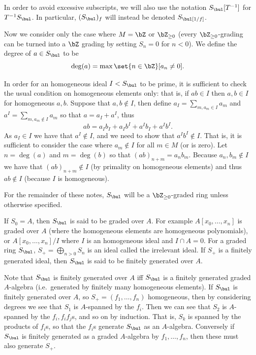 \bnote

    In order to avoid excessive subscripts, we will also use the notation $S_\bul[T^{-1}]$ for $T^{-1}S_\bul$.
    In particular, $(S_\bul)_f$ will instead be denoted $S_\bul[1/f]$.

\enote

Now we consider only the case where $M=\bZ$ or $\bZ_{\geq0}$ (every $\bZ_{\geq0}$-grading can be turned into a $\bZ$ grading
by setting $S_n=0$ for $n<0$).
We define the {\emphcolor degree} of $a\in S_\bul$ to be
$$ \deg(a) = \max\set{n\in\bZ}[a_n\neq0] . $$

In order for an homogeneous ideal $I<S_\bul$ to be prime, it is sufficient to check the usual condition on homogeneous elements
only: that is, if $ab\in I$ then $a,b\in I$ for homogeneous $a,b$.
Suppose that $a,b\notin I$, then define $a_I=\sum_{m,a_m\in I}a_m$ and $a^I=\sum_{m,a_m\notin I}a_m$ so that $a=a_I+a^I$, thus
$$ ab = a_Ib_I + a_Ib^I + a^Ib_I + a^Ib^I . $$
As $a_I\in I$ we have that $a^I\notin I$, and we need to show that $a^Ib^I\notin I$.
That is, it is sufficient to consider the case where $a_m\notin I$ for all $m\in M$ (or is zero).
Let $n=\deg(a)$ and $m=\deg(b)$ so that $(ab)_{n+m}=a_nb_m$.
Because $a_n,b_m\notin I$ we have that $(ab)_{n+m}\notin I$ (by primality on homogeneous elements) and thus $ab\notin I$
(because $I$ is homogeneous).

\bnote

    For the remainder of these notes, $S_\bul$ will be a $\bZ_{\geq0}$-graded ring unless otherwise specified.

\enote

If $S_0=A$, then $S_\bul$ is said to be {\emphcolor graded over $A$}.
For example $A[x_0,\dots,x_n]$ is graded over $A$ (where the homogeneous elements are homogeneous polynomials), or $A[x_0,\dots,x_n]/I$ where $I$ is
an homogeneous ideal and $I\cap A=0$.
For a graded ring $S_\bul$, $S_+=\bigoplus_{n>0}S_n$ is an ideal called the {\emphcolor irrelevant ideal}.
If $S_+$ is a finitely generated ideal, then $S_\bul$ is said to be {\emphcolor finitely generated over $A$}.

Note that $S_\bul$ is finitely generated over $A$ iff $S_\bul$ is a finitely generated graded $A$-algebra (i.e.\ generated by finitely many homogeneous elements).
If $S_\bul$ is finitely generated over $A$, so $S_+=(f_1,\dots,f_n)$ homogeneous, then by considering degrees we see that $S_1$ is $A$-spanned by the $f_i$.
Then we can see that $S_2$ is $A$-spanned by the $f_i,f_if_j$s, and so on by induction.
That is, $S_k$ is spanned by the products of $f_i$s, so that the $f_i$s generate $S_\bul$ as an $A$-algebra.
Conversely if $S_\bul$ is finitely generated as a graded $A$-algebra by $f_1,\dots,f_n$, then these must also generate $S_+$.

